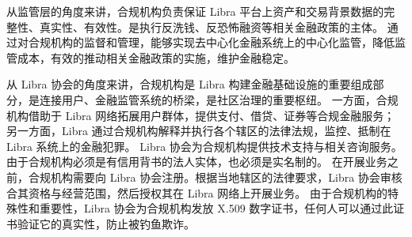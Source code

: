 从监管层的角度来讲，合规机构负责保证 Libra 平台上资产和交易背景数据的完整性、真实性、有效性。是执行反洗钱、反恐怖融资等相关金融政策的主体。
通过对合规机构的监督和管理，能够实现去中心化金融系统上的中心化监管，降低监管成本，有效的推动相关金融政策的实施，维护金融稳定。

从 Libra 协会的角度来讲，合规机构是 Libra 构建金融基础设施的重要组成部分，是连接用户、金融监管系统的桥梁，是社区治理的重要枢纽。
一方面，合规机构借助于 Libra 网络拓展用户群体，提供支付、借贷、证券等合规金融服务；
另一方面，Libra 通过合规机构解释并执行各个辖区的法律法规，监控、抵制在 Libra 系统上的金融犯罪。
Libra 协会为合规机构提供技术支持与相关咨询服务。
由于合规机构必须是有信用背书的法人实体，也必须是实名制的。
在开展业务之前，合规机构需要向 Libra 协会注册。根据当地辖区的法律要求，Libra 协会审核合其资格与经营范围，然后授权其在 Libra 网络上开展业务。
由于合规机构的特殊性和重要性，Libra 协会为合规机构发放 X.509 数字证书，任何人可以通过此证书验证它的真实性，防止被钓鱼欺诈。




